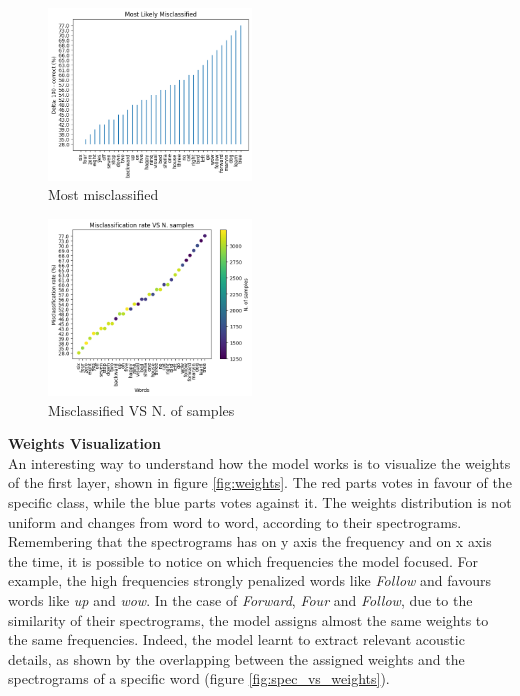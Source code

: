 \documentclass{article}
\begin{document}
\begin{multicols}{2}
    \begin{figure}[H]
        \centering
        \includegraphics[width=0.48\textwidth]{mostmis.png}
        \caption{\small Most misclassified}
        \label{fig:mostmis}
    \end{figure}

    \begin{figure}[H]
        \centering
        \includegraphics[width=0.48\textwidth]{correlation.png}
        \caption{\small Misclassified VS N. of samples}
        \label{fig:correlation}
    \end{figure}

\noindent
\textbf{Weights Visualization}\\
An interesting way to understand how the model works is to visualize the weights of the first layer, shown in figure \ref{fig:weights}. The red parts votes in favour of the specific
class, while the blue parts votes against it. The weights distribution is not uniform and changes from word to word, according to their spectrograms. Remembering that the spectrograms
has on y axis the frequency and on x axis the time, it is possible to notice on which frequencies the model focused. 
For example, the high frequencies strongly penalized words like \textit{Follow} and favours words like \textit{up} and \textit{wow}.
In the case of \textit{Forward}, \textit{Four} and \textit{Follow}, due to the similarity of their spectrograms, the model assigns almost the same weights to the same frequencies.
Indeed, the model learnt to extract relevant acoustic details, as shown by the overlapping between the assigned weights and the spectrograms of a specific
word (figure \ref{fig:spec_vs_weights}). 


\end{multicols}
\end{document}

